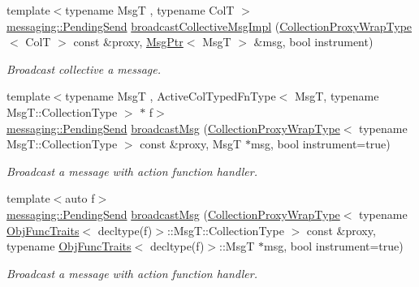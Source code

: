 \begin{DoxyCompactItemize}
{\footnotesize template$<$typename MsgT , typename ColT $>$ }\\\hyperlink{structvt_1_1messaging_1_1_pending_send}{messaging\+::\+Pending\+Send} \hyperlink{structvt_1_1vrt_1_1collection_1_1_collection_manager_aae2f8d1ebc378183074c3572894c7ffc}{broadcast\+Collective\+Msg\+Impl} (\hyperlink{structvt_1_1vrt_1_1collection_1_1_collection_manager_a56458ed7f9bb22b631b9b3a745f42f94}{Collection\+Proxy\+Wrap\+Type}$<$ ColT $>$ const \&proxy, \hyperlink{namespacevt_a9f5ebd62ee9d6dd8829e3e1cc4f858e9}{Msg\+Ptr}$<$ MsgT $>$ \&msg, bool instrument)
\begin{DoxyCompactList}\small\item\em Broadcast collective a message. \end{DoxyCompactList}\item 
{\footnotesize template$<$typename MsgT , Active\+Col\+Typed\+Fn\+Type$<$ Msg\+T, typename Msg\+T\+::\+Collection\+Type $>$ $\ast$ f$>$ }\\\hyperlink{structvt_1_1messaging_1_1_pending_send}{messaging\+::\+Pending\+Send} \hyperlink{structvt_1_1vrt_1_1collection_1_1_collection_manager_a9cadcebd1d7c26512091f9624a23a02c}{broadcast\+Msg} (\hyperlink{structvt_1_1vrt_1_1collection_1_1_collection_manager_a56458ed7f9bb22b631b9b3a745f42f94}{Collection\+Proxy\+Wrap\+Type}$<$ typename Msg\+T\+::\+Collection\+Type $>$ const \&proxy, MsgT $\ast$msg, bool instrument=true)
\begin{DoxyCompactList}\small\item\em Broadcast a message with action function handler. \end{DoxyCompactList}\item 
{\footnotesize template$<$auto f$>$ }\\\hyperlink{structvt_1_1messaging_1_1_pending_send}{messaging\+::\+Pending\+Send} \hyperlink{structvt_1_1vrt_1_1collection_1_1_collection_manager_a3a1d571b26b92b4a8c9a764f765870e9}{broadcast\+Msg} (\hyperlink{structvt_1_1vrt_1_1collection_1_1_collection_manager_a56458ed7f9bb22b631b9b3a745f42f94}{Collection\+Proxy\+Wrap\+Type}$<$ typename \hyperlink{structvt_1_1_obj_func_traits}{Obj\+Func\+Traits}$<$ decltype(f)$>$\+::Msg\+T\+::\+Collection\+Type $>$ const \&proxy, typename \hyperlink{structvt_1_1_obj_func_traits}{Obj\+Func\+Traits}$<$ decltype(f)$>$\+::MsgT $\ast$msg, bool instrument=true)
\begin{DoxyCompactList}\small\item\em Broadcast a message with action function handler. \end{DoxyCompactList}\item 

\end{DoxyCompactItemize}
